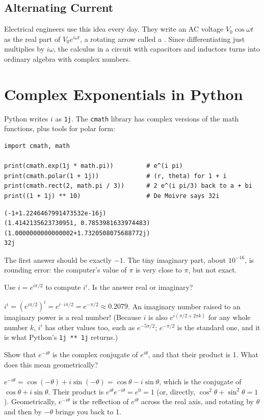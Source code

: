 \subsection{Alternating Current}
Electrical engineers use this idea every day. They write an AC voltage
$V_0\cos\omega t$ as the real part of $V_0e^{i\omega t}$, a rotating arrow called a
. Since differentiating just multiplies by $i\omega$, the calculus in a
circuit with capacitors and inductors turns into ordinary algebra with complex
numbers.

\section{Complex Exponentials in Python}
Python writes $i$ as \texttt{1j}. The \texttt{cmath} library
has complex versions of the math functions, plus tools for polar form:
\begin{verbatim}
import cmath, math

print(cmath.exp(1j * math.pi))         # e^(i pi)
print(cmath.polar(1 + 1j))             # (r, theta) for 1 + i
print(cmath.rect(2, math.pi / 3))      # 2 e^(i pi/3) back to a + bi
print((1 + 1j) ** 10)                  # De Moivre says 32i
\end{verbatim}
\begin{verbatim}
(-1+1.2246467991473532e-16j)
(1.4142135623730951, 0.7853981633974483)
(1.0000000000000002+1.7320508075688772j)
32j
\end{verbatim}
The first answer should be exactly $-1$. The tiny imaginary part, about
$10^{-16}$, is rounding error: the computer's value of $\pi$ is very close to $\pi$,
but not exact.

\begin{Exercise}[title={The Strangest Power}, label=eu_ii]
Use $i = e^{i\pi/2}$ to compute $i^i$. Is the answer real or imaginary?
\end{Exercise}
\begin{Answer}[ref=eu_ii]
$i^i = \left(e^{i\pi/2}\right)^i = e^{i \cdot i\pi/2} = e^{-\pi/2} \approx 0.2079$. An imaginary
number raised to an imaginary power is a real number! (Because $i$ is also
$e^{i(\pi/2 + 2\pi k)}$ for any whole number $k$, $i^i$ has other values too, such as
$e^{-5\pi/2}$; $e^{-\pi/2}$ is the standard one, and it is what Python's
\texttt{1j ** 1j} returns.)
\end{Answer}

\begin{Exercise}[title={Conjugates on the Circle}, label=eu_conj]
Show that $e^{-i\theta}$ is the complex conjugate of $e^{i\theta}$, and that their
product is 1. What does this mean geometrically?
\end{Exercise}
\begin{Answer}[ref=eu_conj]
$e^{-i\theta} = \cos(-\theta) + i\sin(-\theta) = \cos\theta - i\sin\theta$, which is the
conjugate of $\cos\theta + i\sin\theta$. Their product is
$e^{i\theta}e^{-i\theta} = e^{0} = 1$ (or, directly, $\cos^2\theta + \sin^2\theta = 1$).
Geometrically, $e^{-i\theta}$ is the reflection of $e^{i\theta}$ across the real axis,
and rotating by $\theta$ and then by $-\theta$ brings you back to 1.
\end{Answer}

